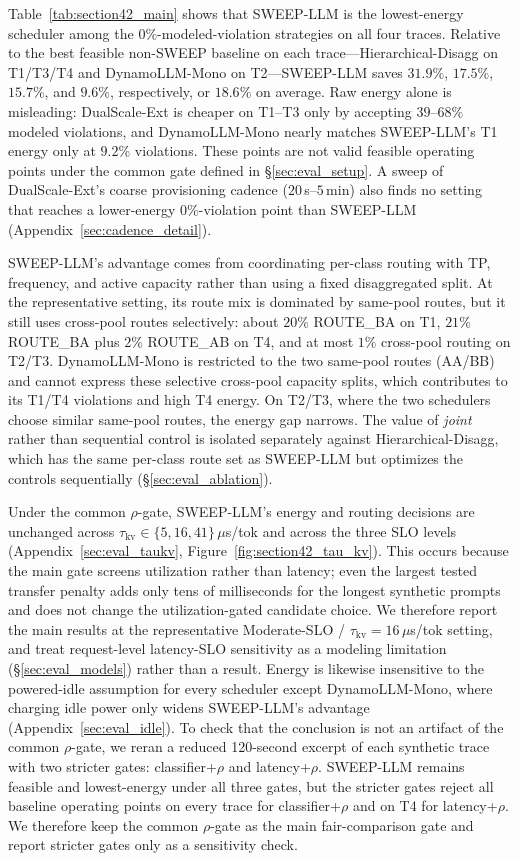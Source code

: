 Table~\ref{tab:section42_main} shows that SWEEP-LLM is the lowest-energy scheduler among the $0\%$-modeled-violation strategies on all four traces.
Relative to the best feasible non-SWEEP baseline on each trace---Hierarchical-Disagg on T1/T3/T4 and DynamoLLM-Mono on T2---SWEEP-LLM saves $31.9\%$, $17.5\%$, $15.7\%$, and $9.6\%$, respectively, or $18.6\%$ on average.
Raw energy alone is misleading: DualScale-Ext is cheaper on T1--T3 only by accepting $39$--$68\%$ modeled violations, and DynamoLLM-Mono nearly matches SWEEP-LLM's T1 energy only at $9.2\%$ violations.
These points are not valid feasible operating points under the common gate defined in \S\ref{sec:eval_setup}.
A sweep of DualScale-Ext's coarse provisioning cadence ($20$\,s--$5$\,min) also finds no setting that reaches a lower-energy $0\%$-violation point than SWEEP-LLM (Appendix~\ref{sec:cadence_detail}).

SWEEP-LLM's advantage comes from coordinating per-class routing with TP, frequency, and active capacity rather than using a fixed disaggregated split.
At the representative setting, its route mix is dominated by same-pool routes, but it still uses cross-pool routes selectively: about $20\%$ ROUTE\_BA on T1, $21\%$ ROUTE\_BA plus $2\%$ ROUTE\_AB on T4, and at most $1\%$ cross-pool routing on T2/T3.
DynamoLLM-Mono is restricted to the two same-pool routes (AA/BB) and cannot express these selective cross-pool capacity splits, which contributes to its T1/T4 violations and high T4 energy.
On T2/T3, where the two schedulers choose similar same-pool routes, the energy gap narrows.
The value of \emph{joint} rather than sequential control is isolated separately against Hierarchical-Disagg, which has the same per-class route set as SWEEP-LLM but optimizes the controls sequentially (\S\ref{sec:eval_ablation}).

Under the common $\rho$-gate, SWEEP-LLM's energy and routing decisions are unchanged across $\tau_{\mathrm{kv}}\in\{5,16,41\}\,\mu$s/tok and across the three SLO levels (Appendix~\ref{sec:eval_taukv}, Figure~\ref{fig:section42_tau_kv}).
This occurs because the main gate screens utilization rather than latency; even the largest tested transfer penalty adds only tens of milliseconds for the longest synthetic prompts and does not change the utilization-gated candidate choice.
We therefore report the main results at the representative Moderate-SLO / $\tau_{\mathrm{kv}}{=}16\,\mu$s/tok setting, and treat request-level latency-SLO sensitivity as a modeling limitation (\S\ref{sec:eval_models}) rather than a result.
Energy is likewise insensitive to the powered-idle assumption for every scheduler except DynamoLLM-Mono, where charging idle power only widens SWEEP-LLM's advantage (Appendix~\ref{sec:eval_idle}).
To check that the conclusion is not an artifact of the common $\rho$-gate, we reran a reduced 120-second excerpt of each synthetic trace with two stricter gates: classifier+$\rho$ and latency+$\rho$.
SWEEP-LLM remains feasible and lowest-energy under all three gates, but the stricter gates reject all baseline operating points on every trace for classifier+$\rho$ and on T4 for latency+$\rho$.
We therefore keep the common $\rho$-gate as the main fair-comparison gate and report stricter gates only as a sensitivity check.

